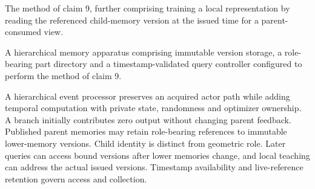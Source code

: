 \documentclass[pct]{sm-patent}
\begin{document}
\begin{patentclaims}
\item The method of claim 9, further comprising training a local representation by reading the referenced child-memory version at the issued time for a parent-consumed view.

\item A hierarchical memory apparatus comprising immutable version storage, a role-bearing part directory and a timestamp-validated query controller configured to perform the method of claim 9.

\end{patentclaims}

\abstractstart

A hierarchical event processor preserves an acquired actor path while adding temporal computation with private state, randomness and optimizer ownership. A branch initially contributes zero output without changing parent feedback. Published parent memories may retain role-bearing references to immutable lower-memory versions. Child identity is distinct from geometric role. Later queries can access bound versions after lower memories change, and local teaching can address the actual issued versions. Timestamp availability and live-reference retention govern access and collection.
\end{document}
